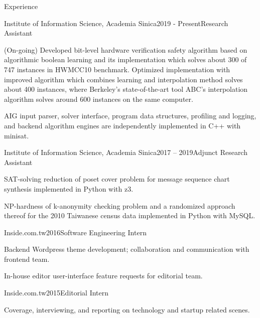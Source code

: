 \documentclass{resume} %
\begin{document}
\begin{rSection}{Experience}

\begin{rSubsection}{Institute of Information Science, Academia Sinica}{2019 - Present}{Research Assistant}{}
\item (On-going) Developed bit-level hardware verification safety algorithm based on algorithmic boolean learning and
its implementation which solves about 300 of 747 instances in HWMCC10 benchmark.
Optimized implementation with improved algorithm which combines learning and interpolation method solves about 400 instances,
where Berkeley's state-of-the-art tool ABC's interpolation algorithm solves around 600 instances on the same computer.

AIG input parser, solver interface, program data structures, profiling and logging, and backend algorithm engines
are independently implemented in C++ with minisat.
\end{rSubsection}


\begin{rSubsection}{Institute of Information Science, Academia Sinica}{2017 – 2019}{Adjunct Research Assistant}{}
\item SAT-solving reduction of poset cover problem for message sequence chart synthesis  implemented in Python with z3.
\item NP-hardness of k-anonymity checking problem and a randomized approach thereof for the 2010 Taiwanese census data
implemented in Python with MySQL.
\end{rSubsection}


\begin{rSubsection}{Inside.com.tw}{2016}{Software Engineering Intern}{}
\item Backend Wordpress theme development; collaboration  and communication with frontend team.
\item In-house editor user-interface feature requests for editorial team.
\end{rSubsection}


\begin{rSubsection}{Inside.com.tw}{2015}{Editorial Intern}{}
\item Coverage, interviewing, and reporting on technology and startup related scenes.
\end{rSubsection}

\end{rSection}
\end{document}
